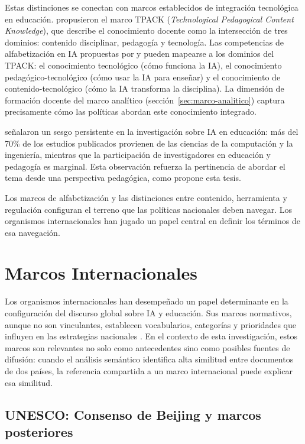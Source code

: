 Estas distinciones se conectan con marcos establecidos de integración tecnológica en educación. \citet{mishra2006technological} propusieron el marco TPACK (\textit{Technological Pedagogical Content Knowledge}), que describe el conocimiento docente como la intersección de tres dominios: contenido disciplinar, pedagogía y tecnología. Las competencias de alfabetización en IA propuestas por \citet{long2020ailiteracy} y \citet{ng2021ailiteracy} pueden mapearse a los dominios del TPACK: el conocimiento tecnológico (cómo funciona la IA), el conocimiento pedagógico-tecnológico (cómo usar la IA para enseñar) y el conocimiento de contenido-tecnológico (cómo la IA transforma la disciplina). La dimensión de formación docente del marco analítico (sección~\ref{sec:marco-analitico}) captura precisamente cómo las políticas abordan este conocimiento integrado.

\citet{zawacki2019systematic} señalaron un sesgo persistente en la investigación sobre IA en educación: más del 70\% de los estudios publicados provienen de las ciencias de la computación y la ingeniería, mientras que la participación de investigadores en educación y pedagogía es marginal. Esta observación refuerza la pertinencia de abordar el tema desde una perspectiva pedagógica, como propone esta tesis.

Los marcos de alfabetización y las distinciones entre contenido, herramienta y regulación configuran el terreno que las políticas nacionales deben navegar. Los organismos internacionales han jugado un papel central en definir los términos de esa navegación.


\section{Marcos Internacionales}
\label{sec:marcos-internacionales}

Los organismos internacionales han desempeñado un papel determinante en la configuración del discurso global sobre IA y educación. Sus marcos normativos, aunque no son vinculantes, establecen vocabularios, categorías y prioridades que influyen en las estrategias nacionales \citep{bareis2022talking}. En el contexto de esta investigación, estos marcos son relevantes no solo como antecedentes sino como posibles fuentes de difusión: cuando el análisis semántico identifica alta similitud entre documentos de dos países, la referencia compartida a un marco internacional puede explicar esa similitud.


\subsection{UNESCO: Consenso de Beijing y marcos posteriores}

